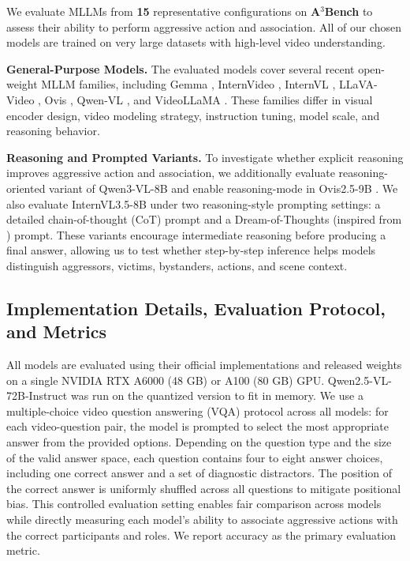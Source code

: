 We evaluate MLLMs from \textbf{15} representative configurations on \textbf{A$^3$Bench} to assess their ability to perform aggressive action and association. All of our chosen models are trained on very large datasets with high-level video understanding. 

\noindent \textbf{General-Purpose Models.}
The evaluated models cover several recent open-weight MLLM families, including Gemma \cite{gemma4}, InternVideo \cite{internvideo2_5}, InternVL \cite{internvl2_5, internvl3, internvl3_5}, LLaVA-Video \cite{llavavideo}, Ovis \cite{ovis2_5}, Qwen-VL \cite{qwen-vl2_5, qwen3vl}, and VideoLLaMA \cite{videollama3}. These families differ in visual encoder design, video modeling strategy, instruction tuning, model scale, and reasoning behavior. 

\noindent \textbf{Reasoning and Prompted Variants.}
To investigate whether explicit reasoning improves aggressive action and association, we additionally evaluate reasoning-oriented variant of Qwen3-VL-8B \cite{qwen3vl} and enable reasoning-mode in Ovis2.5-9B \cite{ovis2_5}. We also evaluate InternVL3.5-8B \cite{internvl3_5} under two reasoning-style prompting settings: a detailed chain-of-thought (CoT) prompt and a Dream-of-Thoughts (inspired from \cite{navigatinghallucinations}) prompt. These variants encourage intermediate reasoning before producing a final answer, allowing us to test whether step-by-step inference helps models distinguish aggressors, victims, bystanders, actions, and scene context.


\subsection{Implementation Details, Evaluation Protocol, and Metrics}

All models are evaluated using their official implementations and released weights on a single NVIDIA RTX A6000 (48 GB) or A100 (80 GB) GPU. Qwen2.5-VL-72B-Instruct \cite{qwen-vl2_5} was run on the quantized version to fit in memory. We use a multiple-choice video question answering (VQA) protocol across all models: for each video-question pair, the model is prompted to select the most appropriate answer from the provided options. Depending on the question type and the size of the valid answer space, each question contains four to eight answer choices, including one correct answer and a set of diagnostic distractors. The position of the correct answer is uniformly shuffled across all questions to mitigate positional bias. This controlled evaluation setting enables fair comparison across models while directly measuring each model's ability to associate aggressive actions with the correct participants and roles. We report accuracy as the primary evaluation metric.
 


